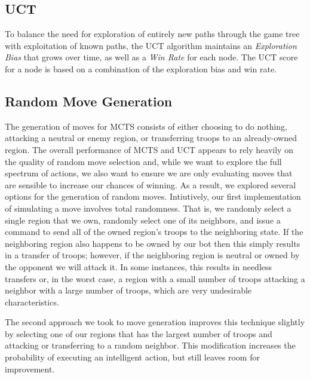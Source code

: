 \documentclass[a4paper,11pt]{article}
\begin{document}

\subsection{UCT}\label{sec:uct}
To balance the need for exploration of entirely new paths through the game tree with
exploitation of known paths, the UCT algorithm maintains an \emph{Exploration Bias} that grows
over time, as well as a \emph{Win Rate} for each node.  The UCT score for a node is based on a
combination of the exploration bias and win rate.

\subsection{Random Move Generation}\label{sec:move_gen}
The generation of moves for MCTS consists of either choosing to do nothing, attacking a neutral 
or enemy region, or transferring troops to an already-owned region. The overall performance of 
MCTS and UCT appears to rely heavily on the quality of random move selection and, while we want to
explore the full spectrum of actions, we also want to ensure we are only evaluating moves that are
sensible to increase our chances of winning. As a result, we explored several options for the 
generation of random moves. Intiutively, our first implementation of simulating a move involves total 
randomness.  That is, we randomly select a single region that we own, randomly select one of its 
neighbors, and issue a command to send all of the owned region's troops to the neighboring state.  
If the neighboring region also happens to be owned by our bot then this simply results in a transfer 
of troops; however, if the neighboring region is neutral or owned by the opponent we will attack it. 
In some instances, this results in needless transfers or, in the worst case, a region with a small 
number of troops attacking a neighbor with a large number of troops, which are very undesirable 
characteristics. 

The second approach we took to move generation improves this technique slightly by selecting one of 
our regions that has the largest number of troops and attacking or transferring to a random neighbor.  
This modification increases the probability of executing an intelligent action, but still leaves room 
for improvement.
\end{document}
